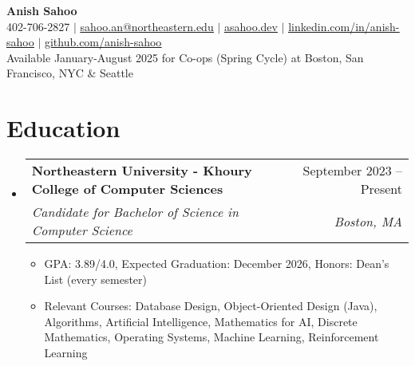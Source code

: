 \documentclass[letterpaper,11pt]{article}
\makeatletter
\newcommand{\resumeItem}[1]{
  \item\small{
    {#1 \vspace{-2pt}}
  }
}
\newcommand{\resumeSubheading}[4]{
  \vspace{-2pt}\item
    \begin{tabular*}{0.97\textwidth}[t]{l@{\extracolsep{\fill}}r}
      \textbf{#1} & #2 \\
      \textit{\small#3} & \textit{\small #4} \\
    \end{tabular*}\vspace{-7pt}
}
\newcommand{\resumeSubHeadingListStart}{\begin{itemize}[leftmargin=0.15in, label={}]}
\newcommand{\resumeSubHeadingListEnd}{\end{itemize}}
\newcommand{\resumeItemListStart}{\begin{itemize}}
\newcommand{\resumeItemListEnd}{\end{itemize}\vspace{-5pt}}
\makeatother
\begin{document}

\begin{center}
    \textbf{\Huge Anish Sahoo} \\ \vspace{1pt}
    \small 402-706-2827 
    $|$ 
    \href{mailto:sahoo.an@northeastern.edu}{\underline{sahoo.an@northeastern.edu}} $|$ 
    \href{https://asahoo.dev}{\underline{asahoo.dev}}
    $|$
    \href{https://linkedin.com/in/anish-sahoo}{\underline{linkedin.com/in/anish-sahoo}} $|$
    \href{https://github.com/anish-sahoo}{\underline{github.com/anish-sahoo}} \vspace{1pt} \\
    Available January-August 2025 for Co-ops (Spring Cycle) at Boston, San Francisco, NYC \& Seattle
\end{center}


\section{Education}
  \resumeSubHeadingListStart
    \resumeSubheading
      {Northeastern University - Khoury College of Computer Sciences}{September 2023 -- Present}
      {Candidate for Bachelor of Science in Computer Science}{Boston, MA}
    \resumeItemListStart
        \resumeItem{GPA: 3.89/4.0, Expected Graduation: December 2026, Honors: Dean's List (every semester)}
        \resumeItem{Relevant Courses: Database Design, Object-Oriented Design (Java), Algorithms, Artificial Intelligence, Mathematics for AI, Discrete Mathematics, Operating Systems, Machine Learning, Reinforcement Learning}
    \resumeItemListEnd
  \resumeSubHeadingListEnd



\end{document}
